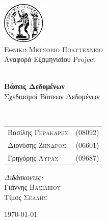\begin{titlepage}
\begin{center}

\includegraphics[width=0.15\textwidth]{title/Pyrforos2.png}\\[1.cm]
\textsc{\LARGE Εθνικό Μετσόβιο Πολυτεχνείο}\\[1.5cm]

\Large{ Αναφορά Εξαμηνιαίου Project }\\[0.5cm]

\begin{doublespace}
\HRule \\[0.4cm]
{\huge \bfseries
Βάσεις Δεδομένων
}\\[0.4cm]
Σχεδιασμοί Βάσεων Δεδομένων\\
\end{doublespace}

\HRule \\[1.5cm]

\begin{minipage}{0.4\textwidth}
\begin{flushleft} \large
\begin{tabular}{l l}
Βασίλης \textsc{Γερακάρης} & (08092)\\
Διονύσης \textsc{Ζήνδρος} & (06601)\\
Γρηγόρης \textsc{Λύρας}	& (09687)\\
\end{tabular}
\end{flushleft}
\end{minipage}
\begin{minipage}{0.4\textwidth}
\begin{flushright} \large
\emph{Διδάσκοντες:} \\
Γιάννης \textsc{Βασιλείου}\\
Τίμος \textsc{Σελλής}
\end{flushright}
\end{minipage}

\vfill

{\large \today}
\end{center}
\end{titlepage}
